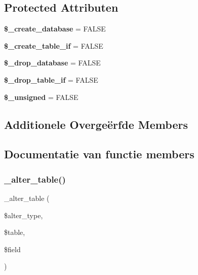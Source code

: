 \subsection*{Protected Attributen}
\begin{DoxyCompactItemize}
\item 
\mbox{\label{class_c_i___d_b__oci8__forge_acd23c9a8735806155f1a5d0a87c151f2}} 
{\bfseries \$\+\_\+create\+\_\+database} = F\+A\+L\+SE
\item 
\mbox{\label{class_c_i___d_b__oci8__forge_a2f6484fcb8d1dc3eef67a637227cd583}} 
{\bfseries \$\+\_\+create\+\_\+table\+\_\+if} = F\+A\+L\+SE
\item 
\mbox{\label{class_c_i___d_b__oci8__forge_a8305b12fc17f6f87778260ebdff287b4}} 
{\bfseries \$\+\_\+drop\+\_\+database} = F\+A\+L\+SE
\item 
\mbox{\label{class_c_i___d_b__oci8__forge_a92a8a9145a7fc91e252e58d019373581}} 
{\bfseries \$\+\_\+drop\+\_\+table\+\_\+if} = F\+A\+L\+SE
\item 
\mbox{\label{class_c_i___d_b__oci8__forge_aae977ae6d61fa183f0b25422b6ddc31c}} 
{\bfseries \$\+\_\+unsigned} = F\+A\+L\+SE
\end{DoxyCompactItemize}
\subsection*{Additionele Overge\"{e}rfde Members}


\subsection{Documentatie van functie members}
\mbox{\label{class_c_i___d_b__oci8__forge_a41c6cae02f2fda8b429ad0afb9509426}} 
\subsubsection{\texorpdfstring{\_alter\_table()}{\_alter\_table()}}
{\footnotesize\ttfamily \+\_\+alter\+\_\+table (\begin{DoxyParamCaption}\item[{}]{\$alter\+\_\+type,  }\item[{}]{\$table,  }\item[{}]{\$field }\end{DoxyParamCaption})\hspace{0.3cm}{\ttfamily [protected]}}

